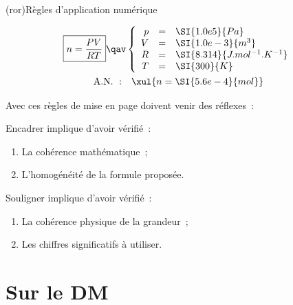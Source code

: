 \documentclass[a4paper, 11pt, final, garamond]{book}
\begin{document}
\begin{tcn}(ror){Règles d'application numérique}
	\vspace*{-10pt}
	\begin{minipage}{0.45\linewidth}
		\begin{gather*}
			\boxed{n = \frac{PV}{RT}}
			\qav
			\left\{
			\begin{array}{rcl}
				p & = & \SI{1.0e5}{Pa}                \\
				V & = & \SI{1.0e-3}{m^3}              \\
				R & = & \SI{8.314}{J.mol^{-1}.K^{-1}} \\
				T & = & \SI{300}{K}
			\end{array}
			\right.\\
			\mathrm{A.N.~:}\quad
			\xul{n = \SI{5.6e-4}{mol}}
		\end{gather*}
	\end{minipage}
	\hfill
	\smallbreak
	Avec ces règles de mise en page doivent venir des réflexes~:
	\smallbreak
	\begin{isd}
		Encadrer implique d'avoir vérifié~:
		\begin{enumerate}
			\item La cohérence mathématique~;
			\item L'homogénéité de la formule proposée.
		\end{enumerate}
		\tcblower
		Souligner implique d'avoir vérifié~:
		\begin{enumerate}
			\item La cohérence physique de la grandeur~;
			\item Les chiffres significatifs à utiliser.
		\end{enumerate}
	\end{isd}
\end{tcn}

\section{Sur le DM}
\end{document}
